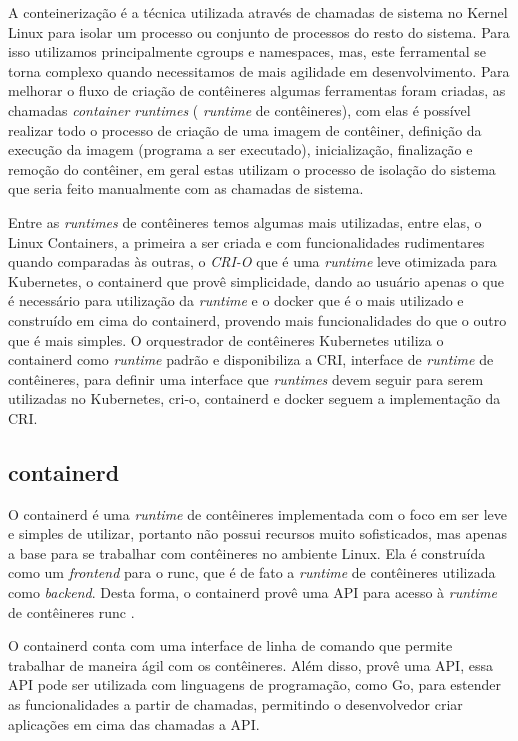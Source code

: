 A conteinerização é a técnica utilizada através de chamadas de sistema no
Kernel Linux para isolar um processo ou conjunto de processos do resto do
sistema. Para isso utilizamos principalmente cgroups e namespaces, mas, este
ferramental se torna complexo quando necessitamos de mais agilidade em
desenvolvimento. Para melhorar o fluxo de criação de contêineres algumas
ferramentas foram criadas, as chamadas \textit{container runtimes} (
\textit{runtime} de contêineres), com elas é possível realizar todo o
processo de criação de uma imagem de contêiner, definição da execução da
imagem (programa a ser executado), inicialização, finalização e remoção do
contêiner, em geral estas utilizam o processo de isolação do sistema que
seria feito manualmente com as chamadas de sistema.

Entre as \textit{runtimes} de contêineres temos algumas mais utilizadas,
entre elas, o Linux Containers, a primeira a ser criada e com funcionalidades
rudimentares quando comparadas às outras, o \textit{CRI-O} que é uma
\textit{runtime} leve otimizada para Kubernetes, o containerd que provê
simplicidade, dando ao usuário apenas o que é necessário para utilização da
\textit{runtime} e o docker que é o mais utilizado e construído em cima do
containerd, provendo mais funcionalidades do que o outro que é mais simples.
O orquestrador de contêineres Kubernetes utiliza o containerd como \textit{runtime}
padrão e disponibiliza a CRI, interface de \textit{runtime} de contêineres, para
definir uma interface que \textit{runtimes} devem seguir para serem utilizadas
no Kubernetes, cri-o, containerd e docker seguem a implementação da CRI.

\subsection{containerd}

O containerd é uma \textit{runtime} de contêineres implementada com o foco em
ser leve e simples de utilizar, portanto não possui recursos muito sofisticados,
mas apenas a base para se trabalhar com contêineres no ambiente Linux. Ela é
construída como um \textit{frontend} para o runc, que é de fato a \textit{runtime}
de contêineres utilizada como \textit{backend}. Desta forma, o containerd provê
uma API para acesso à \textit{runtime} de contêineres runc \cite{containerd}.

O containerd conta com uma interface de linha de comando que permite trabalhar
de maneira ágil com os contêineres. Além disso, provê uma API, essa API pode ser
utilizada com linguagens de programação, como Go, para estender as funcionalidades
a partir de chamadas, permitindo o desenvolvedor criar aplicações em cima das
chamadas a API.

